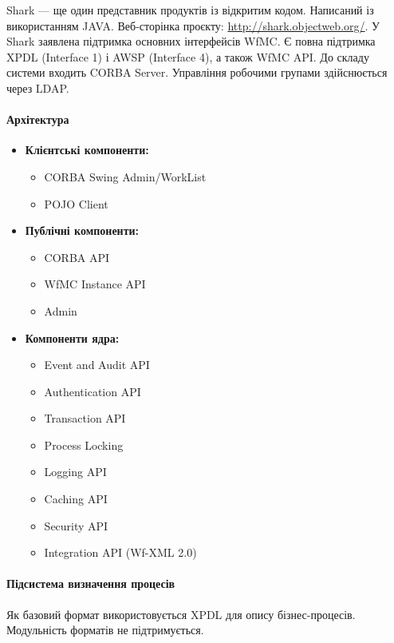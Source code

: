 \documentclass{memoir}
\begin{document}
Shark — ще один представник продуктів із відкритим кодом. Написаний із використанням JAVA. Веб-сторінка проєкту: \url{http://shark.objectweb.org/}. У Shark заявлена підтримка основних інтерфейсів WfMC. Є повна підтримка XPDL (Interface 1) і AWSP (Interface 4), а також WfMC API. До складу системи входить CORBA Server. Управління робочими групами здійснюється через LDAP.

\paragraph{Архітектура}

\begin{itemize}
    \item \textbf{Клієнтські компоненти:}
    \begin{itemize}
        \item CORBA Swing Admin/WorkList
        \item POJO Client
    \end{itemize}
    \item \textbf{Публічні компоненти:}
    \begin{itemize}
        \item CORBA API
        \item WfMC Instance API
        \item Admin
    \end{itemize}
    \item \textbf{Компоненти ядра:}
    \begin{itemize}
        \item Event and Audit API
        \item Authentication API
        \item Transaction API
        \item Process Locking
        \item Logging API
        \item Caching API
        \item Security API
        \item Integration API (Wf-XML 2.0)
    \end{itemize}
\end{itemize}

\paragraph{Підсистема визначення процесів}

Як базовий формат використовується XPDL для опису бізнес-процесів. Модульність форматів не підтримується.
\end{document}
